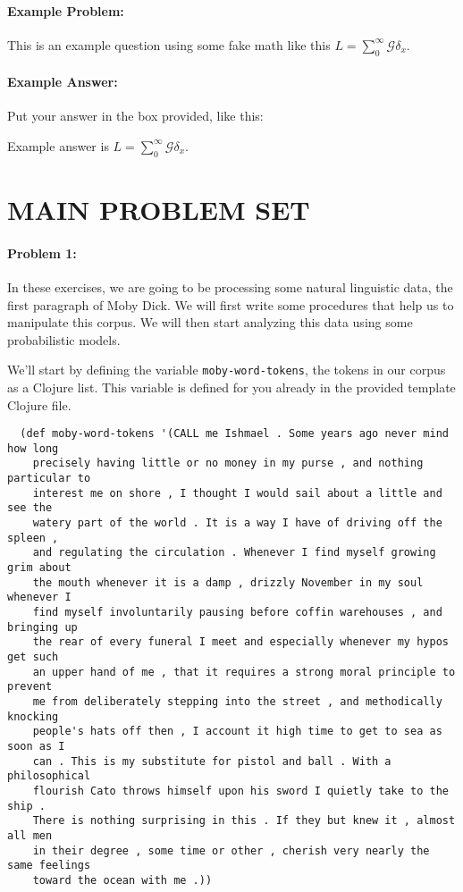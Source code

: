 \documentclass[10pt]{article}
\newenvironment{AnswerBox}{\begin{mdframed}[style=simple]}{\end{mdframed}}
\begin{document}
\hrulefill %

\paragraph{Example Problem:}
This is an example question using some fake math like this
$L=\sum_0^{\infty} \mathcal{G} \delta_x$.

\paragraph{Example Answer:} Put your answer in the box provided, like this:
\begin{AnswerBox}
Example answer is $L=\sum_0^{\infty} \mathcal{G} \delta_x$.
\end{AnswerBox}


\hrulefill%

\pagebreak%
\section*{MAIN PROBLEM SET}
\paragraph{Problem 1:}

In these exercises, we are going to be processing some natural linguistic data,
the first paragraph of Moby Dick. We will first write some procedures that help
us to manipulate this corpus. We will then start analyzing this data using some
probabilistic models.

We'll start by defining the variable \texttt{moby-word-tokens}, the tokens in
our corpus as a Clojure list. This variable is defined for you already in
the provided template Clojure file.

\begin{lstlisting}
  (def moby-word-tokens '(CALL me Ishmael . Some years ago never mind how long
    precisely having little or no money in my purse , and nothing particular to
    interest me on shore , I thought I would sail about a little and see the
    watery part of the world . It is a way I have of driving off the spleen ,
    and regulating the circulation . Whenever I find myself growing grim about
    the mouth whenever it is a damp , drizzly November in my soul whenever I
    find myself involuntarily pausing before coffin warehouses , and bringing up
    the rear of every funeral I meet and especially whenever my hypos get such
    an upper hand of me , that it requires a strong moral principle to prevent
    me from deliberately stepping into the street , and methodically knocking
    people's hats off then , I account it high time to get to sea as soon as I
    can . This is my substitute for pistol and ball . With a philosophical
    flourish Cato throws himself upon his sword I quietly take to the ship .
    There is nothing surprising in this . If they but knew it , almost all men
    in their degree , some time or other , cherish very nearly the same feelings
    toward the ocean with me .))
\end{lstlisting}
\end{document}
